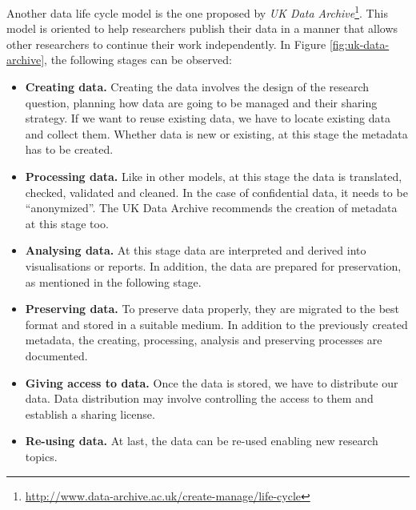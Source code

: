 Another data life cycle model is the one proposed by \textit{UK Data Archive}\footnote{\url{http://www.data-archive.ac.uk/create-manage/life-cycle}}. This model is oriented to help researchers publish their data in a manner that allows other researchers to continue their work independently. In Figure \ref{fig:uk-data-archive}, the following stages can be observed:
\begin{itemize}
    \item \textbf{Creating data.} Creating the data involves the design of the research question, planning how data are going to be managed and their sharing strategy. If we want to reuse existing data, we have to locate existing data and collect them. Whether data is new or existing, at this stage the metadata has to be created.
    \item \textbf{Processing data.} Like in other models, at this stage the data is translated, checked, validated and cleaned. In the case of confidential data, it needs to be ``anonymized''. The UK Data Archive recommends the creation of metadata at this stage too.
    \item \textbf{Analysing data.} At this stage data are interpreted and derived into visualisations or reports. In addition, the data are prepared for preservation, as mentioned in the following stage.
    \item \textbf{Preserving data.} To preserve data properly, they are migrated to the best format and stored in a suitable medium. In addition to the previously created metadata, the creating, processing, analysis and preserving processes are documented.
    \item \textbf{Giving access to data.} Once the data is stored, we have to distribute our data. Data distribution may involve controlling the access to them and establish a sharing license.
    \item \textbf{Re-using data.} At last, the data can be re-used enabling new research topics.
\end{itemize}

